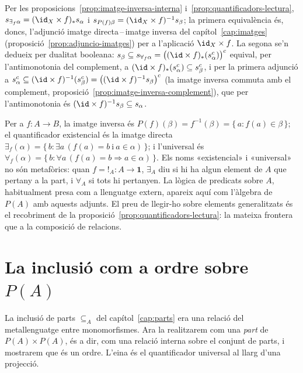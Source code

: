 \begin{prova}
Per les proposicions~\ref{prop:imatge-inversa-interna}
i~\ref{prop:quantificadors-lectura}, \(s_{\exists_f\alpha}=(\id_X\times f)_*s_\alpha\)
i \(s_{P(f)\beta}=(\id_X\times f)^{-1}s_\beta\); la primera equivalència és,
doncs, l'adjunció imatge directa\,--\,imatge inversa del
capítol~\ref{cap:imatges} (proposició~\ref{prop:adjuncio-imatges}) per a
l'aplicació \(\id_X\times f\). La segona se'n dedueix per dualitat
booleana:
\(s_\beta\subseteq s_{\forall_f\alpha}=\bigl((\id\times f)_*(s_\alpha^c)\bigr)^c\)
equival, per l'antimonotonia del complement, a
\((\id\times f)_*(s_\alpha^c)\subseteq s_\beta^c\), i per la primera
adjunció a \(s_\alpha^c\subseteq(\id\times f)^{-1}(s_\beta^c)
=\bigl((\id\times f)^{-1}s_\beta\bigr)^c\) (la imatge inversa commuta amb
el complement, proposició~\ref{prop:imatge-inversa-complement}), que per
l'antimonotonia és \((\id\times f)^{-1}s_\beta\subseteq s_\alpha\).
\end{prova}

\begin{observacio}\label{obs:quantificadors-classica}
Per a \(f\colon A\to B\), la imatge inversa és
\(P(f)(\beta)=f^{-1}(\beta)=\{\,a:f(a)\in\beta\,\}\); el quantificador
existencial és la imatge directa
\(\exists_f(\alpha)=\{\,b:\exists a\,(f(a)=b\ \text{i}\ a\in\alpha)\,\}\);
i l'universal és
\(\forall_f(\alpha)=\{\,b:\forall a\,(f(a)=b\Rightarrow a\in\alpha)\,\}\).
Els noms «existencial» i «universal» no són metafòrics: quan
\(f={!}_A\colon A\to\mathbf1\), \(\exists_A\) diu si hi ha algun element de
\(A\) que pertany a la part, i \(\forall_A\) si tots hi pertanyen. La
lògica de predicats sobre \(A\), habitualment presa com a llenguatge
extern, apareix aquí com l'àlgebra de \(P(A)\) amb aquests adjunts. El
preu de llegir-ho sobre elements generalitzats és el recobriment de la
proposició~\ref{prop:quantificadors-lectura}: la mateixa frontera que a
la composició de relacions.
\end{observacio}

\section{\texorpdfstring{La inclusió com a ordre sobre \(P(A)\)}{La inclusió com a ordre sobre P(A)}}\label{sec:inclusio-ordre}

La inclusió de parts \(\subseteq_A\) del capítol~\ref{cap:parts} era una
relació del metallenguatge entre monomorfismes. Ara la realitzarem com una
\emph{part} de \(P(A)\times P(A)\), és a dir, com una relació interna
sobre el conjunt de parts, i mostrarem que és un ordre. L'eina és el
quantificador universal al llarg d'una projecció.

